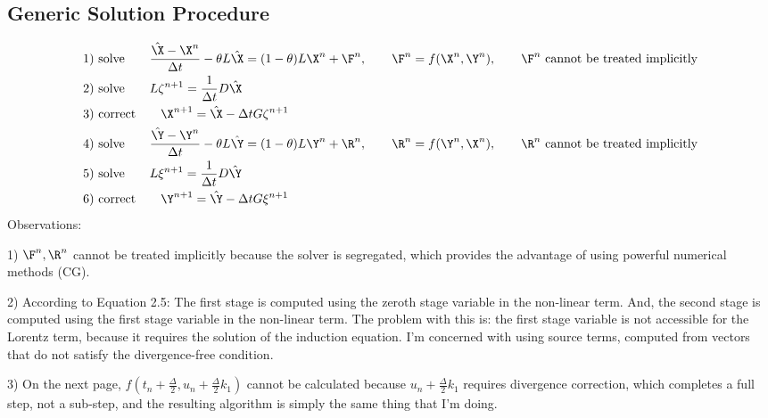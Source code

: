 \documentclass[11pt]{article}
\begin{document}
\subsection{Generic Solution Procedure}
\begin{equation}\begin{aligned}
&\text{1) solve} \qquad \frac{\hat{\X}-\X^n}{\Delta t} - \theta L\hat{\X} = (1-\theta) L\X^n + \F^n, \qquad \F^n = f(\X^n,\Y^n), \qquad \F^n \text{ cannot be treated implicitly}\\
&\text{2) solve} \qquad L \zeta^{n+1} = \frac{1}{\Delta t} D \hat{\X} \\
&\text{3) correct} \qquad \X^{n+1} = \hat{\X} - \Delta t G \zeta^{n+1} \\
&\text{4) solve} \qquad \frac{\hat{\Y}-\Y^n}{\Delta t} - \theta L\hat{\Y} = (1-\theta) L\Y^n + \R^n, \qquad \R^n = f(\Y^n,\X^n), \qquad \R^n \text{ cannot be treated implicitly} \\
&\text{5) solve} \qquad L \xi^{n+1} = \frac{1}{\Delta t} D \hat{\Y} \\
&\text{6) correct} \qquad \Y^{n+1} = \hat{\Y} - \Delta t G \xi^{n+1} \\
\end{aligned}\end{equation}
Observations:

1) $\F^n,\R^n$ cannot be treated implicitly because the solver is segregated, which provides the advantage of using powerful numerical methods (CG).

2) According to Equation 2.5: The first stage is computed using the zeroth stage variable in the non-linear term. And, the second stage is computed using the first stage variable in the non-linear term. The problem with this is: the first stage variable is not accessible for the Lorentz term, because it requires the solution of the induction equation. I'm concerned with using source terms, computed from vectors that do not satisfy the divergence-free condition.

3) On the next page, $f(t_n+\frac{\Delta}{2}, u_n + \frac{\Delta}{2} k_1)$ cannot be calculated because $u_n + \frac{\Delta}{2} k_1$ requires divergence correction, which completes a full step, not a sub-step, and the resulting algorithm is simply the same thing that I'm doing.

\newpage
\end{document}
